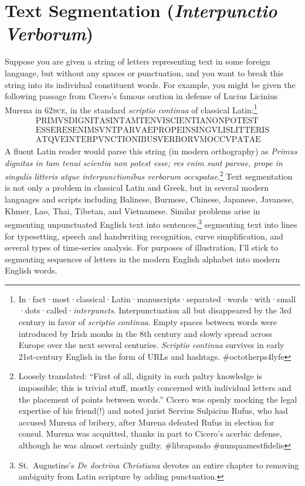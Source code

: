 \section{Text Segmentation (\textit{Interpunctio Verborum})}
\label{sec:2.5}

Suppose you are given a string of letters representing text in some foreign language, but without any spaces or punctuation, and you want to break this string into its individual constituent words.
For example, you might be given the following passage from Cicero’s famous oration in defense of Lucius Licinius Murena in 62\textsc{bce}, in the standard \textit{scriptio continua} of classical Latin:\footnote{In·fact·most·classical·Latin·manuscripts·separated·words·with·small·dots·called·\textit{interpuncts}. Interpunctuation all but disappeared by the 3rd century in favor of \textit{scriptio continua}. Empty spaces between words were introduced by Irish monks in the 8th century and slowly spread across Europe over the next several centuries. \textit{Scriptio continua} survives in early 21st-century English in the form of URLs and hashtags. \textsf{\#octotherps4lyfe}}
\[
\begin{array}{c}
\mbox{PRIMVSDIGNITASINTAMTENVISCIENTIANONPOTEST}\\
\mbox{ESSERESENIMSVNTPARVAEPROPEINSINGVLISLITTERIS}\\
\mbox{ATQVEINTERPVNCTIONIBUSVERBORVMOCCVPATAE}
\end{array}
\]
A fluent Latin reader would parse this string (in modern orthography) as \textit{Primus dignitas in tam tenui scientia non potest esse; res enim sunt parvae, prope in singulis litteris atque interpunctionibus verborum occupatae}.\footnote{Loosely translated: “First of all, dignity in such paltry knowledge is impossible; this is trivial stuff, mostly concerned with individual letters and the placement of points between words.” Cicero was openly mocking the legal expertise of his friend(!) and noted jurist Servius Sulpicius Rufus, who had accused Murena of bribery, after Murena defeated Rufus in election for consul. Murena was acquitted, thanks in part to Cicero’s acerbic defense, although he was almost certainly guilty. \textsf{\#librapondo \#nunquamestfidelis}}
Text segmentation is not only a problem in classical Latin and Greek, but in several modern languages and scripts including Balinese, Burmese, Chinese, Japanese, Javanese, Khmer, Lao, Thai, Tibetan, and Vietnamese.
Similar problems arise in segmenting unpunctuated English text into sentences,\footnote{St.\ Augustine’s \textit{De doctrina Christiana} devotes an entire chapter to removing ambiguity from Latin scripture by adding punctuation.} segmenting text into lines for typesetting, speech and handwriting recognition, curve simplification, and several types of time-series analysis.
For purposes of illustration, I’ll stick to segmenting sequences of letters in the modern English alphabet into modern English words.

